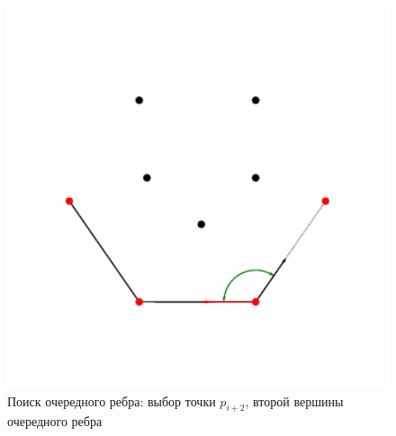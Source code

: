 \documentclass[14pt]{extarticle}
\begin{document}
\begin{figure}[t]
\begin{minipage}{0.4\textwidth}
    \hspace*{-0.1\textwidth}\includegraphics[width=1.25\textwidth]{gift9.pdf}

    \vspace*{-7ex}

    \caption{Поиск очередного ребра: выбор точки $p_{i+2}$, второй вершины очередного ребра}
    \label{fig:2D_6}
  \end{minipage}
  \hfill{}
\end{figure}
\end{document}

